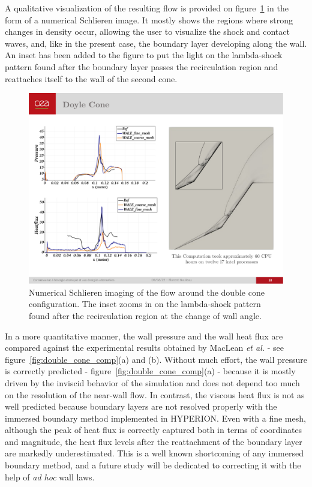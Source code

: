 A qualitative visualization of the resulting flow is provided on figure~\ref{fig:double_cone_schlieren} in the form of a numerical Schlieren image.
It mostly shows the regions where strong changes in density occur, allowing the user to visualize the shock and contact waves, and, like in the present case, the boundary layer developing along the wall.
An inset has been added to the figure to put the light on the lambda-shock pattern found after the boundary layer passes the recirculation region and reattaches itself to the wall of the second cone.

\begin{figure}[ht!]
    \centering
    \includegraphics[width=0.35\linewidth]{chapter3_numerical_methods/pictures/double_cone_schlieren.pdf}
    \caption{Numerical Schlieren imaging of the flow around the double cone configuration.
    The inset zooms in on the lambda-shock pattern found after the recirculation region at the change of wall angle.}
    \label{fig:double_cone_schlieren}
\end{figure}

In a more quantitative manner, the wall pressure and the wall heat flux are compared against the experimental results obtained by MacLean \emph{et al.} \cite{MacLean2014} - see figure~\ref{fig:double_cone_comp}(a) and (b).
Without much effort, the wall pressure is correctly predicted - figure~\ref{fig:double_cone_comp}(a) - because it is mostly driven by the inviscid behavior of the simulation and does not depend too much on the resolution of the near-wall flow.
In contrast, the viscous heat flux is not as well predicted because boundary layers are not resolved properly with the immersed boundary method implemented in HYPERION.
Even with a fine mesh, although the peak of heat flux is correctly captured both in terms of coordinates and magnitude, the heat flux levels after the reattachment of the boundary layer are markedly underestimated.
This is a well known shortcoming of any immersed boundary method, and a future study will be dedicated to correcting it with the help of \emph{ad hoc} wall laws.

